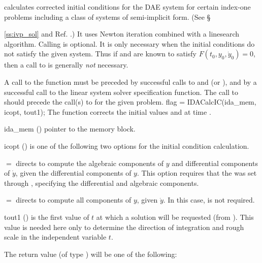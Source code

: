  calculates corrected initial conditions for the DAE system
for certain index-one problems including a class of systems of semi-implicit
form.  (See \S{\ref{ss:ivp_sol} and Ref. \cite{BHP:98}.)
It uses Newton iteration combined with a linesearch algorithm.
Calling  is optional. It is only necessary when the  
initial conditions do not satisfy the given system.  Thus if   
 and  are known to satisfy $F(t_0, y_0, \dot{y}_0) = 0$, 
then a call to  is generally {\em not} necessary.

A call to the function  must be preceded by successful calls to  
 and  (or ), and by a 
successful call to the linear system solver specification function.  
The call to  should precede the call(s) to   
for the given problem.
%
{
  flag = IDACalcIC(ida\_mem, icopt, tout1);
}
{
  The function  corrects the initial values  and  at
  time .
}
{
  \begin{args}

  \item[ida\_mem] ()
    pointer to the {\idas} memory block.

  \item[icopt] ()
    is one of the following two options for the initial condition calculation.
    
    $ = $ directs  to compute 
    the algebraic components of $y$ and differential components of $\dot{y}$, 
    given the differential components of $y$.  
    This option requires that the   was set through 
    , specifying the differential and algebraic components.  
    
    $ = $ directs  to compute all  
    components of $y$, given $\dot{y}$.  In this case,  is not required.

  \item[tout1] ()
    is the first value of $t$ at which a solution will be requested (from
    ).  This value is needed here only to determine the direction of
    integration and rough scale in the independent variable $t$.   

  \end{args}
}
{
  The return value  (of type ) will be one of the following:

}}

